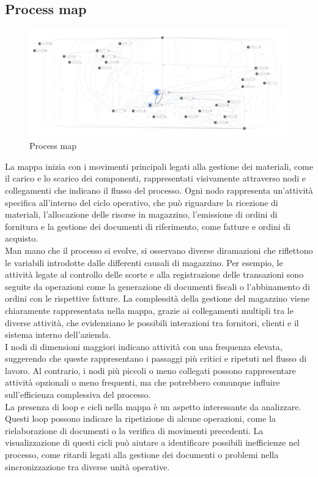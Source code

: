 \documentclass{article}
\begin{document}
\subsection{Process map}
\begin{figure}[H]
    \centering
    \includegraphics[width=\textwidth]{imgMicrosoft/DatiReali/ProcessMapDatiReali.png}
    \caption{Process map}
    \label{fig:process-map}
\end{figure}
La mappa inizia con i movimenti principali legati alla gestione dei materiali, come il carico e lo scarico dei componenti, rappresentati visivamente attraverso nodi e collegamenti che indicano il flusso del processo. Ogni nodo rappresenta un'attività specifica all'interno del ciclo operativo, che può riguardare la ricezione di materiali, l'allocazione delle risorse in magazzino, l'emissione di ordini di fornitura e la gestione dei documenti di riferimento, come fatture e ordini di acquisto.\\
Man mano che il processo si evolve, si osservano diverse diramazioni che riflettono le variabili introdotte dalle differenti causali di magazzino. Per esempio, le attività legate al controllo delle scorte e alla registrazione delle transazioni sono seguite da operazioni come la generazione di documenti fiscali o l'abbinamento di ordini con le rispettive fatture. La complessità della gestione del magazzino viene chiaramente rappresentata nella mappa, grazie ai collegamenti multipli tra le diverse attività, che evidenziano le possibili interazioni tra fornitori, clienti e il sistema interno dell'azienda.\\
I nodi di dimensioni maggiori indicano attività con una frequenza elevata, suggerendo che queste rappresentano i passaggi più critici e ripetuti nel flusso di lavoro. Al contrario, i nodi più piccoli o meno collegati possono rappresentare attività opzionali o meno frequenti, ma che potrebbero comunque influire sull'efficienza complessiva del processo.\\
La presenza di loop e cicli nella mappa è un aspetto interessante da analizzare. Questi loop possono indicare la ripetizione di alcune operazioni, come la rielaborazione di documenti o la verifica di movimenti precedenti. La visualizzazione di questi cicli può aiutare a identificare possibili inefficienze nel processo, come ritardi legati alla gestione dei documenti o problemi nella sincronizzazione tra diverse unità operative.\\
\end{document}
